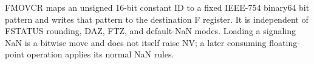FMOVCR maps an unsigned 16-bit constant ID to a fixed IEEE-754 binary64 bit pattern and writes that pattern to the destination F register. It is independent of FSTATUS rounding, DAZ, FTZ, and default-NaN modes. Loading a signaling NaN is a bitwise move and does not itself raise NV; a later consuming floating-point operation applies its normal NaN rules.
